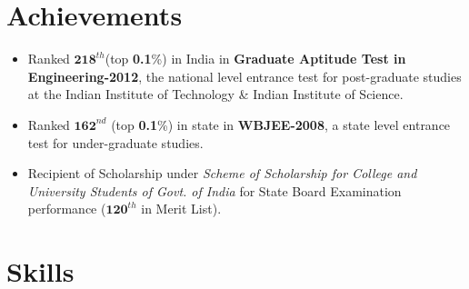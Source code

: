\documentclass[margin,line]{resume}
\begin{document}
\begin{resume}
	\section{\mysidestyle Achievements}
\begin{itemize}[topsep=2pt, partopsep=1pt, itemsep=2pt, parsep=1pt, leftmargin=15pt]
    \item Ranked $\textbf{218}^{th}$(top \textbf{0.1}\%) in India in \textbf{Graduate Aptitude Test in Engineering-2012}, the national level entrance test for post-graduate studies at the Indian Institute of Technology \& {Indian Institute of Science}.  
    \item Ranked $\textbf{162}^{nd}$ (top \textbf{0.1}\%) in state in \textbf{WBJEE-2008}, a state level entrance test for under-graduate studies.
    \item Recipient of Scholarship under \textit{Scheme of Scholarship for College and University Students of Govt. of India}  for State Board Examination performance ($\textbf{120}^{th}$ in Merit List).
	\end{itemize}
%	
%

	
	
	
    \section{\mysidestyle Skills}
    

\end{resume}
\end{document}
